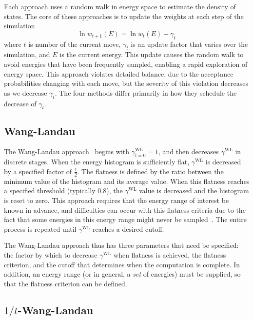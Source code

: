\documentclass[letterpaper,twocolumn,amsmath,amssymb,pre,aps,10pt]{revtex4-1}
\begin{document}
Each approach uses a random walk in energy space to estimate the density of
states.  The core of these approaches is to update the weights at each step of
the simulation
\begin{equation}
	\ln{w_{t+1}(E)}=\ln{w_{t}(E)}
	+\gamma_t
\end{equation}
where $t$ is number of the current move, $\gamma_t$ is an update factor
that varies over the simulation, and $E$ is the current energy.  This update
causes the random walk to avoid energies that have been frequently sampled,
enabling a rapid exploration of energy space. This approach violates detailed
balance, due to the acceptance probabilities changing with each move, but the
severity of this violation decreases as we decrease $\gamma_t$.  The four
methods differ primarily in how they schedule the decrease of $\gamma_t$.

\subsection{Wang-Landau}

The Wang-Landau approach~\cite{wang2001efficient,wang2001determining,
landau2014guide} begins with $\gamma^{\text{WL}}_{t=0}=1$, and then decreases
$\gamma^{\text{WL}}$ in discrete stages.  When the energy histogram is
sufficiently flat, $\gamma^{\text{WL}}$ is decreased by a specified factor of
$\frac12$.  The flatness is defined by the ratio between the minimum value of
the histogram and its average value.  When this flatness reaches a specified
threshold (typically 0.8), the $\gamma^{\text{WL}}$ value is decreased and the
histogram is reset to zero.  This approach requires that the energy range of
interest be known in advance, and difficulties can occur with this flatness
criteria due to the fact that some energies in this energy range might never be
sampled~\cite{troster2005wang}.  The entire process is repeated until
$\gamma^{\text{WL}}$ reaches a desired cutoff.

The Wang-Landau approach thus has three parameters that need be
specified: the factor by which to decrease $\gamma^{\text{WL}}$ when flatness is
achieved, the flatness criterion, and the cutoff that determines when
the computation is complete.  In addition, an energy range (or in
general, a \emph{set} of energies) must be supplied, so that the
flatness criterion can be defined.

\subsection{$1/t$-Wang-Landau}
\end{document}
